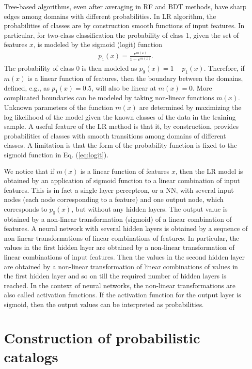 \documentclass{aa}
\newcommand{\bea}{\begin{eqnarray}}
\newcommand{\eea}{\end{eqnarray}}
\newcommand{\lb}{\label}
\begin{document}
Tree-based algorithms, even after averaging in RF and BDT methods, have sharp edges among domains with different probabilities.
In LR algorithm, the probabilities of classes are by construction smooth functions of input features.
In particular, for two-class classification the probability of class 1, given the set of features $x$, is modeled by the sigmoid (logit) function
\bea
\lb{eq:logit}
p_1(x) = \frac{e^{m(x)}}{1 + e^{m(x)}}.
\eea
The probability of class 0 is then modeled as $p_0(x) = 1 - p_1(x)$.
Therefore, if $m(x)$ is a linear function of features, then the boundary between the domains, defined, e.g., as $p_1(x) = 0.5$, will also be linear
at $m(x) = 0$.
More complicated boundaries can be modeled by taking non-linear functions $m(x)$.
Unknown parameters of the function $m(x)$ are determined by maximizing the log likelihood of the model given the known classes of the data in the training sample.
A useful feature of the LR method is that it, by construction, provides probabilities of classes with smooth transitions among domains of different classes.
A limitation is that the form of the probability function is fixed to the sigmoid function in Eq. (\ref{eq:logit}).

We notice that if $m(x)$ is a linear function of features $x$, then the LR model is obtained by an application of sigmoid function to a linear combination of input features.
This is in fact a single layer perceptron, or a NN, with several input nodes (each node corresponding to a feature) and one output node, which corresponds to $p_0(x)$, but without any hidden layers.
The output value is obtained by a non-linear transformation (sigmoid) of a linear combination of features.
A neural network with several hidden layers is obtained by a sequence of non-linear transformations of linear combinations of features.
In particular, the values in the first hidden layer are obtained by a non-linear transformation of linear combinations of input features.
Then the values in the second hidden layer are obtained by a non-linear transformation of linear combinations of values in the first hidden layer and so on till the required number of hidden layers is reached.
In the context of neural networks, the non-linear transformations are also called activation functions.
If the activation function for the output layer is sigmoid, then the output values can be interpreted as probabilities.


\section{Construction of probabilistic catalogs}
\lb{sec:training}
\end{document}

